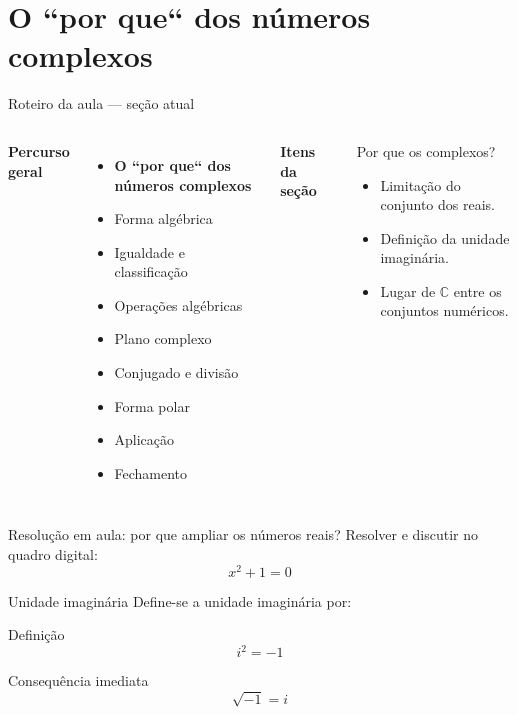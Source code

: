 \documentclass[aspectratio=169]{beamer}
\newcommand{\EspacoEscrita}[1]{%
  \vspace{0.25em}
  \begin{minipage}[t][#1][t]{\linewidth}
  \end{minipage}
}
\newcommand{\secaoAtual}[1]{{\color{ThemeAccent}\textbf{\large #1}}}
\newcommand{\secaoFutura}[1]{{\color{ThemeDark!55}#1}}
\newcommand{\MapaSecao}[3]{%
\begin{frame}{Roteiro da aula — seção atual}
\vspace{-0.55em}
\begin{columns}[T,onlytextwidth]
\column{0.54\textwidth}
\footnotesize
\textbf{Percurso geral}\par\vspace{0.25em}
#1
\column{0.03\textwidth}
\column{0.35\textwidth}
\footnotesize
\textbf{Itens da seção}\par\vspace{0.25cm}
\begin{block}{#2}
#3
\end{block}
\column{0.03\textwidth}
\end{columns}
\end{frame}
}
\begin{document}
\section{O ``por que`` dos números complexos}

\MapaSecao{
\begin{itemize}
  \item \secaoAtual{O ``por que`` dos números complexos}
  \item \secaoFutura{Forma algébrica}
  \item \secaoFutura{Igualdade e classificação}
  \item \secaoFutura{Operações algébricas}
  \item \secaoFutura{Plano complexo}
  \item \secaoFutura{Conjugado e divisão}
  \item \secaoFutura{Forma polar}
  \item \secaoFutura{Aplicação}
  \item \secaoFutura{Fechamento}
\end{itemize}
}{Por que os complexos?}{
\begin{itemize}
  \item Limitação do conjunto dos reais.
  \item Definição da unidade imaginária.
  \item Lugar de $\mathbb{C}$ entre os conjuntos numéricos.
\end{itemize}
}

\begin{frame}{Resolução em aula: por que ampliar os números reais?}
\vspace{-0.2em}
\small
Resolver e discutir no quadro digital:
\[
  x^2 + 1 = 0
\]
\EspacoEscrita{0.58\textheight}
\end{frame}

\begin{frame}{Unidade imaginária}
\vspace{-0.4em}
\small
Define-se a unidade imaginária por:

\vspace{0.8em}
\begin{block}{Definição}
\[
  i^2=-1
\]
\end{block}

\vspace{0.5em}
\begin{block}{Consequência imediata}
\[
  \sqrt{-1}=i
\]
\end{block}
\end{frame}
\end{document}
